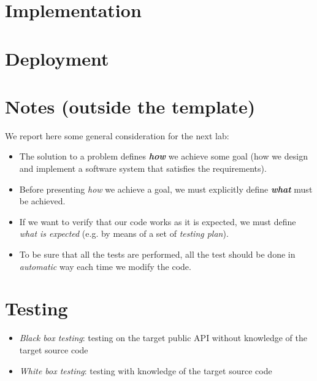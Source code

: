\documentclass{llncs}
\newcommand{\labelsec}[1]{\label{sec:#1}}
\begin{document}
\section{Implementation}
\labelsec{Implementation}

\section{Deployment}
\labelsec{Deployment}
 
\newpage
\section{Notes (outside the template)}
\labelsec{Notes}
We report here some general consideration for the next lab:
\begin{itemize}
  \item The solution to a problem defines \textbf{\emph{how}} we achieve some goal (how we design and implement a software system that satisfies the requirements).
  \item Before presenting \emph{how} we achieve a goal, we must explicitly define \textbf{\emph{what}} must be achieved.
  \item If we want to verify that our code works as it is expected, we must define \emph{what is expected} (e.g. by means of a set of \emph{testing plan}).
  \item  To be sure that all the tests are performed, all the test should be done in \emph{automatic} way each time we modify the code.
 \end{itemize}

\section{Testing}
\labelsec{testing}
\begin{itemize}
  \item \emph{Black box testing}: testing on the target public API without knowledge of the target source code
  \item \emph{White box testing}: testing with knowledge of the target source code
\end{itemize}
\end{document}
